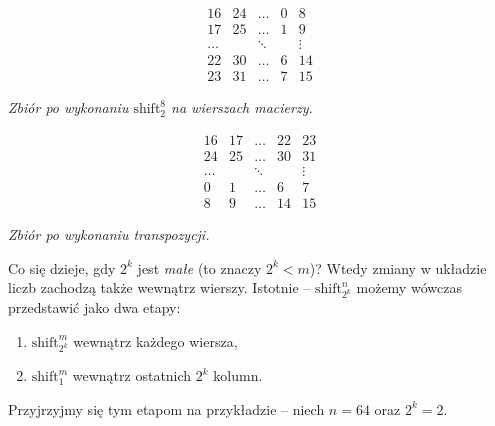 \documentclass[a4paper]{article}
\newcommand{\shift}[2]{\text{shift}_{#2}^{#1}}
\theoremstyle{definition}
\begin{document}
\begin{minipage}{.5\textwidth} %
\[
\begin{matrix}
 16 &  24 &  \ldots & 0 & 8 \\
 17 &  25 &  \ldots & 1 & 9 \\
\ldots  & &  \ddots &   & \vdots \\
 22 &  30 &  \ldots & 6 & 14 \\
 23 &  31 &  \ldots & 7 & 15
\end{matrix}
\]

\begin{center} \it
    Zbiór po wykonaniu \(\shift{8}{2}\) na wierszach macierzy.
\end{center}

\end{minipage} %
\begin{minipage}{.5\textwidth} %

\[
\begin{matrix}
 16 &  17 &  \ldots & 22 & 23 \\
 24 &  25 &  \ldots & 30 & 31 \\
\ldots  & &  \ddots &    & \vdots \\
  0 &   1 &  \ldots &  6 & 7 \\
  8 &   9 &  \ldots &  14 & 15
\end{matrix}
\]

\begin{center} \it
    Zbiór po wykonaniu transpozycji.
\end{center}
\end{minipage}

Co się dzieje, gdy \(2^k\) jest \textit{małe} (to znaczy \(2^k < m \))? Wtedy zmiany w układzie liczb zachodzą także wewnątrz wierszy. Istotnie -- \(\shift n {2^k}\) możemy wówczas przedstawić jako dwa etapy:
\begin{enumerate}
    \item \(\shift{m}{2^k}\) wewnątrz każdego wiersza,
    \item \(\shift{m}{1}\) wewnątrz ostatnich \(2^k\) kolumn.
\end{enumerate}

Przyjrzyjmy się tym etapom na przykładzie -- niech \(n=64\) oraz \(2^k = 2\).

\vspace{0.5em}
\end{document}
